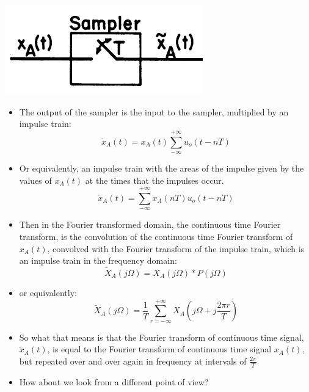 \documentclass[pdflatex,compress,mathserif]{beamer}
\begin{document}
\begin{frame}
	\begin{center}
		\includegraphics[width=0.3\linewidth]{img/img03}
	\end{center}
	\begin{itemize}
		\item The output of the sampler is the input to the sampler, multiplied by an impulse train:
		\[ \tilde{x}_A(t) = x_A(t)\sum_{- \infty}^{+\infty} u_o (t - nT) \]
		\item Or equivalently, an impulse train with the areas of the impulse given by the values of $ x_A(t) $ at the times that the impulses occur.
		\[ \tilde{x}_A(t) = \sum_{- \infty}^{+\infty} x_A(nT) u_o (t - nT) \]
	\end{itemize}
\end{frame}

\begin{frame}
	\begin{itemize}
		\item Then in the Fourier transformed domain, the continuous time Fourier transform, is the convolution of the continuous time Fourier transform of $ x_A(t) $, convolved with the Fourier transform of the impulse train, which is an impulse train in the frequency domain:
		\[ \tilde{X}_A(j\Omega) = X_A(j\Omega)*P(j\Omega) \]
		\item or equivalently:
		\[ \tilde{X}_A(j\Omega) = \frac{1}{T} \sum_{r = -\infty}^{+ \infty} X_A \left(j\Omega+j\frac{2 \pi r}{T}\right) \]
	\end{itemize}
\end{frame}

\begin{frame}
	\begin{itemize}
		\item So what that means is that the Fourier transform of continuous time signal, $ \tilde{x}_A(t) $, is equal to the Fourier transform of continuous time signal $ x_A(t) $, but repeated over and over again in frequency at intervals of $ \frac{2\pi}{T} $
	\end{itemize}
\end{frame}

\begin{frame}
	\begin{itemize}
		\item How about we look from a different point of view?
		\[  \]
	\end{itemize}
\end{frame}
\end{document}

